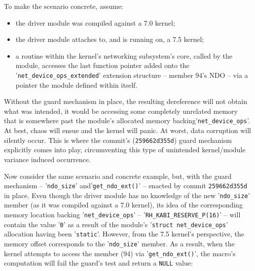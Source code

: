 \documentclass[10pt,oneside,english]{book}
\begin{document}
To make the scenario concrete, assume:
\begin{itemize}
\item the driver module was compiled against a 7.0 kernel;
\item the driver module attaches to, and is running on, a 7.5 kernel;
\item a routine within the kernel's networking subsystem's core, called
by the module, accesses the last function pointer added onto the '\texttt{net\_device\_ops\_extended}'
extension structure -- member 94's NDO -- via a pointer the module
defined within itself.
\end{itemize}
Without the guard mechanism in place, the resulting dereference will
not obtain what was intended, it would be accessing some completely
unrelated memory that is somewhere past the module's allocated memory
backing\linebreak'\texttt{net\_device\_ops}'. At best, chaos will ensue and
the kernel will panic. At worst, data corruption will silently occur.
This is where the commit's (\texttt{259662d355d}) guard mechanism
explicitly comes into play, circumventing this type of unintended
kernel/module variance induced occurrence.

Now consider the same scenario and concrete example, but, with the
guard mechanism -- '\texttt{ndo\_size}' and\linebreak'\texttt{get\_ndo\_ext()}'
-- enacted by commit \texttt{259662d355d} in place. Even though the
driver module has no knowledge of the new '\texttt{ndo\_size}' member
(as it was compiled against a 7.0 kernel), its idea of the corresponding
memory location backing '\texttt{net\_device\_ops}' -- '\texttt{RH\_KABI\_RESERVE\_P(16)}'
-- will contain the value '\texttt{0}' as a result of the module's
'\texttt{struct net\_device\_ops}' allocation having been '\texttt{static}'.
However, from the 7.5 kernel's perspective, the memory offset corresponds
to the '\texttt{ndo\_size}' member. As a result, when the kernel attempts
to access the member (94) via '\texttt{get\_ndo\_ext()}', the macro's
computation will fail the guard's test and return a \texttt{NULL}
value:

\end{document}
